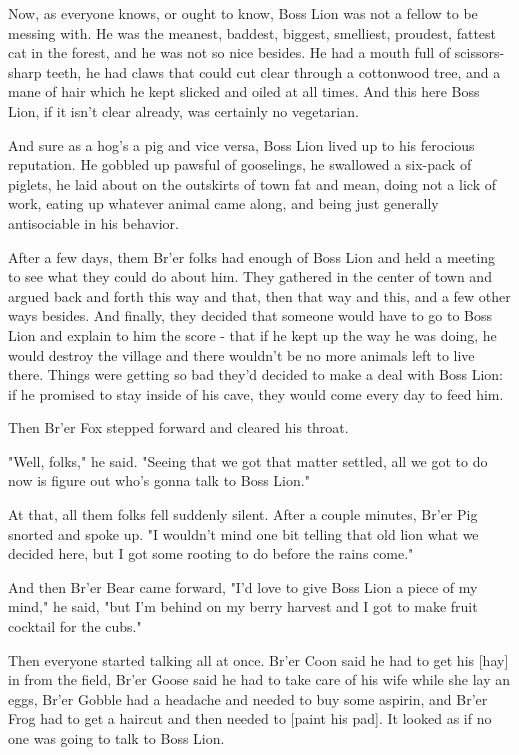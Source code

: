 Now, as everyone knows, or ought to know, Boss Lion was not a fellow to be messing with. He was the meanest, baddest, biggest, smelliest, proudest, fattest cat in the forest, and he was not so nice besides. He had a mouth full of scissors-sharp teeth, he had claws that could cut clear through a cottonwood tree, and a mane of hair which he kept slicked and oiled at all times. And this here Boss Lion, if it isn't clear already, was certainly no vegetarian.

And sure as a hog's a pig and vice versa, Boss Lion lived up to his ferocious reputation. He gobbled up pawsful of gooselings, he swallowed a six-pack of piglets, he laid about on the outskirts of town fat and mean, doing not a lick of work, eating up whatever animal came along, and being just generally antisociable in his behavior.

After a few days, them Br'er folks had enough of Boss Lion and held a meeting to see what they could do about him. They gathered in the center of town and argued back and forth this way and that, then that way and this, and a few other ways besides. And finally, they decided that someone would have to go to Boss Lion and explain to him the score - that if he kept up the way he was doing, he would destroy the village and there wouldn't be no more animals left to live there. Things were getting so bad they'd decided to make a deal with Boss Lion: if he promised to stay inside of his cave, they would come every day to feed him.

Then Br'er Fox stepped forward and cleared his throat.

"Well, folks," he said. "Seeing that we got that matter settled, all we got to do now is figure out who's gonna talk to Boss Lion."

At that, all them folks fell suddenly silent. After a couple minutes, Br'er Pig snorted and spoke up. "I wouldn't mind one bit telling that old lion what we decided here, but I got some rooting to do before the rains come."

And then Br'er Bear came forward, "I'd love to give Boss Lion a piece of my mind," he said, "but I'm behind on my berry harvest and I got to make fruit cocktail for the cubs."

Then everyone started talking all at once. Br'er Coon said he had to get his [hay] in from the field, Br'er Goose said he had to take care of his wife while she lay an eggs, Br'er Gobble had a headache and needed to buy some aspirin, and Br'er Frog had to get a haircut and then needed to [paint his pad]. It looked as if no one was going to talk to Boss Lion.

